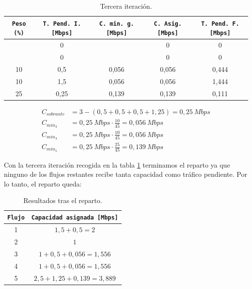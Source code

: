 \documentclass[11pt]{article}
\begin{document}
        \begin{table}
            \centering
            \begin{tabular}{|c|c|c|c|c|}
                \hline
                \texttt{Peso (\%)} & \texttt{T. Pend. I. [Mbps]} & \texttt{C. min. g. [Mbps]} & \texttt{C. Asig. [Mbps]} & \texttt{T. Pend. F. [Mbps]}\\
                \hline
                & 0 & & 0 & 0\\
                \hline
                & 0 & & 0 & 0\\
                \hline
                10 & 0,5 & 0,056 & 0,056 & 0,444\\
                \hline
                10 & 1,5 & 0,056 & 0,056 & 1,444\\
                \hline
                25 & 0,25 & 0,139 & 0,139 & 0,111\\
                \hline
            \end{tabular}
            \caption{Tercera iteración.}
            \label{tab:iter3}
        \end{table}

        \begin{align} \label{eq:iter3}
            C_{sobrante} &=  3 - (0,5 + 0,5 + 0,5 + 1,25) = 0,25\ Mbps\\
            C_{min_3} &= 0,25\ Mbps \cdot \frac{10}{45} = 0,056\ Mbps\\
            C_{min_4} &= 0,25\ Mbps \cdot \frac{10}{45} = 0,056\ Mbps\\
            C_{min_5} &= 0,25\ Mbps \cdot \frac{25}{45} = 0,139\ Mbps
        \end{align}

        Con la tercera iteración recogida en la tabla \ref{tab:iter3} terminamos el reparto ya que ninguno de los flujos restantes recibe tanta capacidad como tráfico pendiente. Por lo tanto, el reparto queda:

        \begin{table}
            \centering
            \begin{tabular}{|c|c|}
                \hline
                \texttt{Flujo} & \texttt{Capacidad asignada [Mbps]}\\
                \hline
                1 & $1,5 + 0,5 = 2$\\
                \hline
                2 & $1$\\
                \hline
                3 & $1 + 0,5 + 0,056 = 1,556$\\
                \hline
                4 & $1 + 0,5 + 0,056 = 1,556$\\
                \hline
                5 & $2,5 + 1,25 + 0,139 = 3,889$\\
                \hline
            \end{tabular}
            \caption{Resultados tras el reparto.}
            \label{tab:results}
        \end{table}
\end{document}
